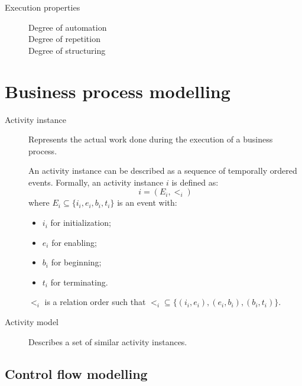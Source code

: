 \begin{description}
\begin{description}
            \item[Execution properties] \phantom{}
                \begin{description}
                    \item[Degree of automation] 
                    \item[Degree of repetition] 
                    \item[Degree of structuring] 
                \end{description}
        \end{description}
\end{description}



\section{Business process modelling}

\begin{description}
    \item[Activity instance] 
        Represents the actual work done during the execution of a business process.

        An activity instance can be described as a sequence of temporally ordered events.
        Formally, an activity instance $i$ is defined as:
        \[ i = (E_i, <_i) \]
        where $E_i \subseteq \{ i_i, e_i, b_i, t_i \}$ is an event with:
        \begin{itemize}
            \item $i_i$ for initialization;
            \item $e_i$ for enabling;
            \item $b_i$ for beginning;
            \item $t_i$ for terminating.
        \end{itemize}
        $<_i$ is a relation order such that $<_i \subseteq \{ (i_i, e_i), (e_i, b_i), (b_i, t_i) \}$.

    \item[Activity model] 
        Describes a set of similar activity instances.
\end{description}


\subsection{Control flow modelling}

